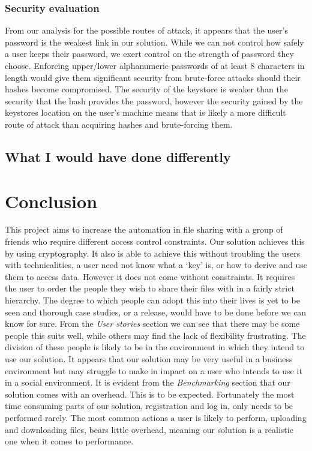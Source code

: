 \documentclass[12pt, titlepage]{article}
\begin{document}
\subsubsection*{Security evaluation}
From our analysis for the possible routes of attack, it appears that the user's password is the weakest link in our solution. While we can not control how safely a user keeps their password, we exert control on the strength of password they choose. Enforcing upper/lower alphanumeric passwords of at least 8 characters in length would give them significant security from brute-force attacks should their hashes become compromised.
\newline \indent The security of the keystore is weaker than the security that the hash provides the password, however the security gained by the keystores location on the user's machine means that is likely a more difficult route of attack than acquiring hashes and brute-forcing them.

\subsection{What I would have done differently}

\section{Conclusion}
This project aims to increase the automation in file sharing with a group of friends who require different access control constraints. Our solution achieves this by using cryptography. It also is able to achieve this without troubling the users with technicalities, a user need not know what a `key' is, or how to derive and use them to access data.
\newline \indent However it does not come without constraints. It requires the user to order the people they wish to share their files with in a fairly strict hierarchy. The degree to which people can adopt this into their lives is yet to be seen and thorough case studies, or a release, would have to be done before we can know for sure. From the \textit{User stories} section we can see that there may be some people this suits well, while others may find the lack of flexibility frustrating. The division of these people is likely to be in the environment in which they intend to use our solution. It appears that our solution may be very useful in a business environment but may struggle to make in impact on a user who intends to use it in a social environment.
\newline \indent It is evident from the \textit{Benchmarking} section that our solution comes with an overhead. This is to be expected. Fortunately the most time consuming parts of our solution, registration and log in, only needs to be performed rarely. The most common actions a user is likely to perform, uploading and downloading files, bears little overhead, meaning our solution is a realistic one when it comes to performance.
\end{document}
